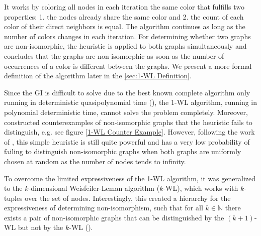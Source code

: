 \documentclass[11pt, dvipsnames, DIV=12]{scrreprt}
\theoremstyle{definition}
\begin{document}
It works by coloring all nodes in each iteration the same color that fulfills two properties: 1. the nodes already share the same color and 2. the count of each color of their direct neighbors is equal. The algorithm continues as long as the number of colors changes in each iteration.
For determining whether two graphs are non-isomorphic, the heuristic is applied to both graphs simultaneously and concludes that the graphs are non-isomorphic as soon as the number of occurrences of a color is different between the graphs. We present a more formal definition of the algorithm later in the \autoref{sec:1-WL Definition}.

Since the \textsc{GI} is difficult to solve due to the best known complete algorithm only running in deterministic quasipolynomial time (\cite{Babai2016}), the 1-WL algorithm, running in polynomial deterministic time, cannot solve the problem completely. Moreover, \cite{Cai1992} constructed counterexamples of non-isomorphic graphs that the heuristic fails to distinguish, e.g. see figure \autoref{1-WL Counter Example}. However, following the work of \cite{Bab+1979}, this simple heuristic is still quite powerful and has a very low probability of failing to distinguish non-isomorphic graphs when both graphs are uniformly chosen at random as the number of nodes tends to infinity.

To overcome the limited expressiveness of the 1-WL algorithm, it was generalized to the $k$-dimensional Weisfeiler-Leman algorithm ($k$-WL), which works with $k$-tuples over the set of nodes. Interestingly, this created a hierarchy for the expressiveness of determining non-isomorphism, such that for all $k \in \mathbb{N}$ there exists a pair of non-isomorphic graphs that can be distinguished by the $(k+1)$-WL but not by the $k$-WL (\cite{Cai1992}).
\end{document}
